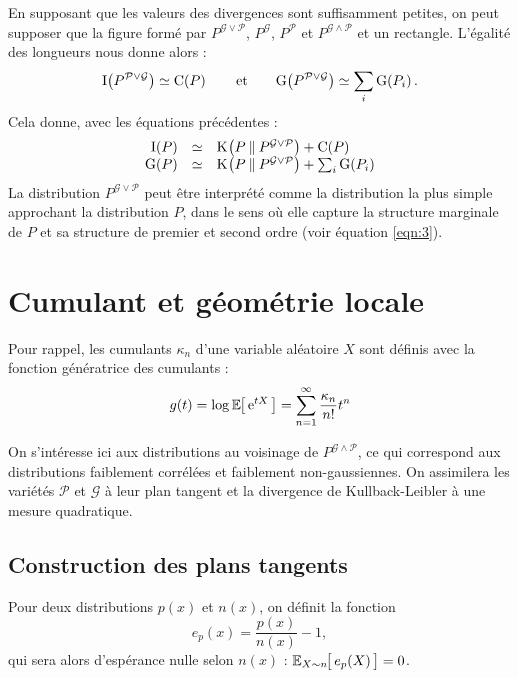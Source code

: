 \documentclass[a4paper]{article}
\newcommand{\Kl}[3][]{\mathrm K_{#1}\!\zp{#2\:\|\:#3}}
\newcommand{\zZ}[2]{\mathrm #1\!\zp{#2}}
\newcommand{\zD}{\mathcal}
\begin{document}
En supposant que les valeurs des divergences sont suffisamment petites, on peut supposer que la figure formé par $P^{\zD G\vee\zD P}$, $P^{\zD G}$, $P^{\zD P}$ et $P^{\zD G\wedge\zD P}$ et un rectangle. L'égalité des longueurs nous donne alors :
\[
\zZ I{P^{\zD P\vee\zD G}} \simeq \zZ CP\qquad\mbox{et}\qquad
\zZ G{P^{\zD P\vee\zD G}} \simeq \sum_i\zZ G{P_i}.\]
Cela donne, avec les équations précédentes :\[\begin{array}{rcl}
\zZ IP &\simeq& \Kl P{P^{\zD G\vee\zD P}} + \zZ CP\\
\zZ GP &\simeq& \Kl P{P^{\zD G\vee\zD P}} + \sum_i\zZ G{P_i}\\
\end{array}\]
La distribution $P^{\zD G\vee\zD P}$ peut être interprété comme la distribution la plus simple approchant la distribution $P$, dans le sens où elle capture la structure marginale de $P$ et sa structure de premier et second ordre (voir équation \ref{eqn:3}).


\section{Cumulant et géométrie locale}

Pour rappel, les cumulants $\kappa_n$ d'une variable aléatoire $X$ sont définis avec la fonction génératrice des cumulants :\begin{equation}
  g(t) = \log\zesp{\zexp{tX}} = \sum_{n=1}^{\infty} \frac{\kappa_n}{n!}t^n
\end{equation}

On s'intéresse ici aux distributions au voisinage de $P^{\zD G\wedge\zD P}$, ce qui correspond aux distributions faiblement corrélées et faiblement non-gaussiennes. On assimilera les variétés $\zD P$ et $\zD G$ à leur plan tangent et la divergence de Kullback-Leibler à une mesure quadratique.

\subsection{Construction des plans tangents}

Pour deux distributions $p(x)$ et $n(x)$, on définit la fonction \[
e_p(x) = \frac{p(x)}{n(x)}-1,
\]
qui sera alors d'espérance nulle selon $n(x)$ : $\zesp[X\sim n]{e_p(X)}=0$.
\end{document}
